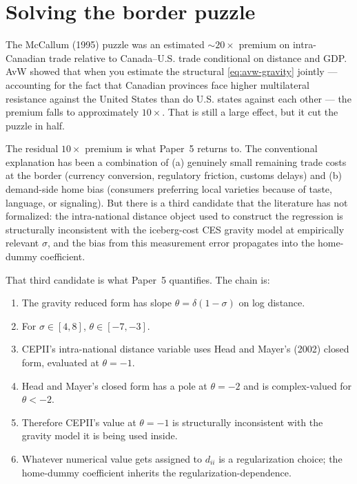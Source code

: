 \documentclass[11pt,letterpaper,oneside]{book}
\theoremstyle{definition}
\theoremstyle{remark}
\begin{document}
\section{Solving the border puzzle}

The McCallum (1995) puzzle was an estimated $\sim 20\times$ premium on intra-Canadian trade relative to Canada--U.S. trade conditional on distance and GDP. AvW showed that when you estimate the structural \eqref{eq:avw-gravity} jointly --- accounting for the fact that Canadian provinces face higher multilateral resistance against the United States than do U.S. states against each other --- the premium falls to approximately $10\times$. That is still a large effect, but it cut the puzzle in half.

The residual $10\times$ premium is what Paper~5 returns to. The conventional explanation has been a combination of (a) genuinely small remaining trade costs at the border (currency conversion, regulatory friction, customs delays) and (b) demand-side home bias (consumers preferring local varieties because of taste, language, or signaling). But there is a third candidate that the literature has not formalized: the intra-national distance object used to construct the regression is structurally inconsistent with the iceberg-cost CES gravity model at empirically relevant $\sigma$, and the bias from this measurement error propagates into the home-dummy coefficient.

That third candidate is what Paper~5 quantifies. The chain is:

\begin{enumerate}
\item The gravity reduced form has slope $\theta = \delta(1-\sigma)$ on log distance.
\item For $\sigma \in [4, 8]$, $\theta \in [-7, -3]$.
\item CEPII's intra-national distance variable uses Head and Mayer's (2002) closed form, evaluated at $\theta = -1$.
\item Head and Mayer's closed form has a pole at $\theta = -2$ and is complex-valued for $\theta < -2$.
\item Therefore CEPII's value at $\theta = -1$ is structurally inconsistent with the gravity model it is being used inside.
\item Whatever numerical value gets assigned to $d_{ii}$ is a regularization choice; the home-dummy coefficient inherits the regularization-dependence.
\end{enumerate}
\end{document}
